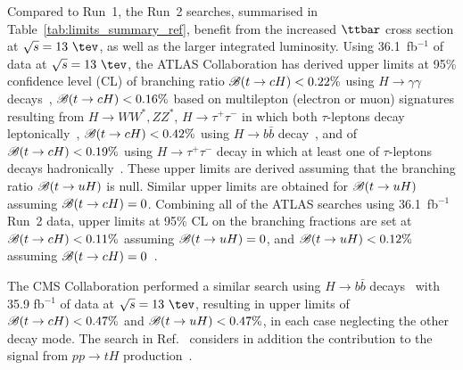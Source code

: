 \documentclass[PAPER, coverpage, atlasdraft=true, texlive=2016, UKenglish]{\ATLASLATEXPATH atlasdoc}
\begin{document}
Compared to Run~1, the Run~2 searches, summarised in Table~\ref{tab:limits_summary_ref}, benefit from the increased $\ttbar$ cross section at $\sqrt{s}=13~\tev$, as well as the larger integrated luminosity.
Using 36.1~fb$^{-1}$ of data at $\sqrt{s}=13~\tev$, the ATLAS Collaboration has derived upper limits at 95\% confidence level (CL) of branching ratio
$\mathscr{B}(t\to cH)<0.22\%$ using $H\to \gamma\gamma$ decays~\cite{Aaboud:2017mfd}, $\mathscr{B}(t\to cH)<0.16\%$ based on
multilepton (electron or muon) signatures resulting from 
$H \to  WW^*, ZZ^*$, $H\to \tau^+\tau^-$ in which both $\tau$-leptons decay leptonically~\cite{Aaboud:2018pob},
$\mathscr{B}(t\to cH)<0.42\%$ using $H\to b\bar{b}$ decay~\cite{fcnc36}, and of $\mathscr{B}(t\to cH)<0.19\%$ using $H\to \tau^+\tau^-$ decay in which at least
one of $\tau$-leptons decays hadronically~\cite{fcnc36}.  
These upper limits are derived assuming that the branching ratio $\mathscr{B}(t\to uH)$ is null. Similar upper limits are obtained for $\mathscr{B}(t\to uH)$ assuming $\mathscr{B}(t\to cH)=0$.
Combining all of the ATLAS searches using 36.1~fb$^{-1}$ Run~2 data, upper limits at 95\% CL on the branching fractions are 
set at $\mathscr{B}(t\to cH)<0.11\%$ assuming $\mathscr{B}(t\to uH)=0$, and $\mathscr{B}(t\to uH)<0.12\%$ assuming $\mathscr{B}(t\to cH)=0$~\cite{fcnc36}.

The CMS Collaboration performed a similar search using  
$H\to b\bar{b}$ decays~\cite{Sirunyan:2017uae} with 35.9 fb$^{-1}$ of data at $\sqrt{s}=13~\tev$, resulting 
in upper limits of $\mathscr{B}(t\to cH)<0.47\%$ and $\mathscr{B}(t\to uH)<0.47\%$, in each case neglecting the other decay mode.
The search in Ref.~\cite{Sirunyan:2017uae} considers in addition the contribution to the signal from 
$pp \to tH$ production~\cite{Greljo:2014dka}. 
\end{document}
